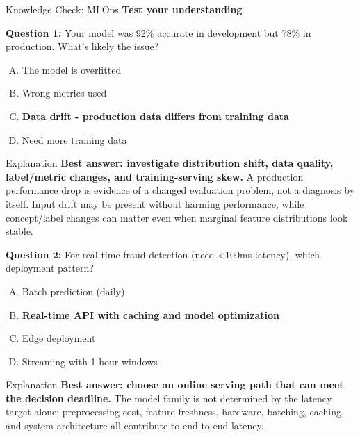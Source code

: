 \begin{frame}{Knowledge Check: MLOps}
\textbf{Test your understanding}

\vspace{0.2cm}

\textbf{Question 1:} Your model was 92\% accurate in development but 78\% in production. What's likely the issue?

\begin{enumerate}[A)]
\item The model is overfitted
\item Wrong metrics used
\item \textcolor{forest}{\textbf{Data drift - production data differs from training data}}
\item Need more training data
\end{enumerate}

\pause

\begin{block}{Explanation}
\textcolor{forest}{\textbf{Best answer: investigate distribution shift, data quality, label/metric changes, and training-serving skew.}} A production performance drop is evidence of a changed evaluation problem, not a diagnosis by itself. Input drift may be present without harming performance, while concept/label changes can matter even when marginal feature distributions look stable.
\end{block}

\pause

\vspace{0.2cm}

\textbf{Question 2:} For real-time fraud detection (need <100ms latency), which deployment pattern?

\begin{enumerate}[A)]
\item Batch prediction (daily)
\item \textcolor{forest}{\textbf{Real-time API with caching and model optimization}}
\item Edge deployment
\item Streaming with 1-hour windows
\end{enumerate}

\pause

\begin{block}{Explanation}
\textcolor{forest}{\textbf{Best answer: choose an online serving path that can meet the decision deadline.}} The model family is not determined by the latency target alone; preprocessing cost, feature freshness, hardware, batching, caching, and system architecture all contribute to end-to-end latency.
\end{block}
\end{frame}

